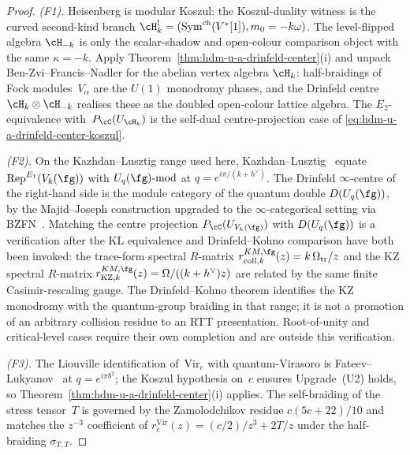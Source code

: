 \begin{proof}
\emph{(F1).} Heisenberg is modular Koszul: the Koszul-duality
witness is the curved second-kind branch
\(\cH_k^!=(\mathrm{Sym}^{\mathrm{ch}}(V^*[1]),m_0=-k\omega)\).
The level-flipped algebra \(\cH_{-k}\) is only the scalar-shadow and
open-colour comparison object with the same \(\kappa=-k\). Apply
Theorem~\ref{thm:hdm-u-a-drinfeld-center}\textup{(i)} and unpack
Ben-Zvi--Francis--Nadler for the abelian vertex algebra
$\cH_k$: half-braidings of Fock modules~$V_\alpha$ are the $U(1)$
monodromy phases, and the Drinfeld centre
$\cH_k\otimes \cH_{-k}$ realises these as the doubled open-colour lattice
algebra. The $E_2$-equivalence with~$P_\cC(U_{\cH_k})$ is the
self-dual centre-projection case of
\eqref{eq:hdm-u-a-drinfeld-center-koszul}.

\emph{(F2).} On the Kazhdan--Lusztig range used here,
Kazhdan--Lusztig~\cite{KL93} equate
$\mathrm{Rep}^{E_1}(V_k(\fg))$ with $U_q(\fg)\text{-}\mathrm{mod}$
at $q = e^{i\pi/(k+h^\vee)}$. The
Drinfeld $\infty$-centre of the right-hand side is the module category
of the quantum double $D(U_q(\fg))$, by the Majid--Joseph
construction upgraded to the $\infty$-categorical setting via
BZFN~\cite{BZFN10}. Matching the centre projection
$P_\cC(U_{V_k(\fg)})$ with $D(U_q(\fg))$ is a verification after the
KL equivalence and Drinfeld--Kohno comparison have both been invoked:
the trace-form spectral $R$-matrix
$r^{KM,\fg}_{\mathrm{coll},k}(z) = k\,\Omega_{\mathrm{tr}}/z$
and the KZ spectral $R$-matrix
$r^{KM,\fg}_{\mathrm{KZ},k}(z)=\Omega/((k+h^\vee)z)$ are related by
the same finite Casimir-rescaling gauge. The Drinfeld--Kohno theorem
identifies the KZ monodromy with the quantum-group braiding in that
range; it is not a promotion of an arbitrary collision residue to an
RTT presentation. Root-of-unity and critical-level cases require their
own completion and are outside this verification.

\emph{(F3).} The Liouville identification of~$\mathrm{Vir}_c$ with
quantum-Virasoro is Fateev--Lukyanov~\cite{FL88} at
$q = e^{i\pi b^2}$; the Koszul hypothesis on~$c$ ensures
Upgrade~(U2) holds, so
Theorem~\ref{thm:hdm-u-a-drinfeld-center}\textup{(i)} applies. The
self-braiding of the stress tensor~$T$ is governed by the
Zamolodchikov residue $c(5c+22)/10$ and matches the $z^{-3}$
coefficient of $r^{\mathrm{Vir}}_c(z) = (c/2)/z^3 + 2T/z$ under the
half-braiding $\sigma_{T,T}$.
\end{proof}

